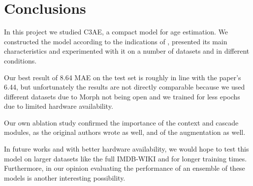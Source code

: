 
\chapter{Conclusions}

In this project we studied C3AE, a compact model for age estimation.
We constructed the model according to the indications of \cite{c3ae},
presented its main characteristics and experimented
with it on a number of datasets and in different conditions.

Our best result of 8.64 MAE on the test set is roughly in line with the paper's
6.44, but unfortunately the results are not directly comparable because
we used different datasets due to Morph not being open and we trained for
less epochs due to limited hardware availability.

Our own ablation study confirmed the importance of the context and
cascade modules, as the original authors wrote as well,
and of the augmentation as well.

In future works and with better hardware availability, we would hope
to test this model on larger datasets like the full IMDB-WIKI and
for longer training times. Furthermore, in our opinion evaluating the
performance of an ensemble of these models is another interesting possibility.
